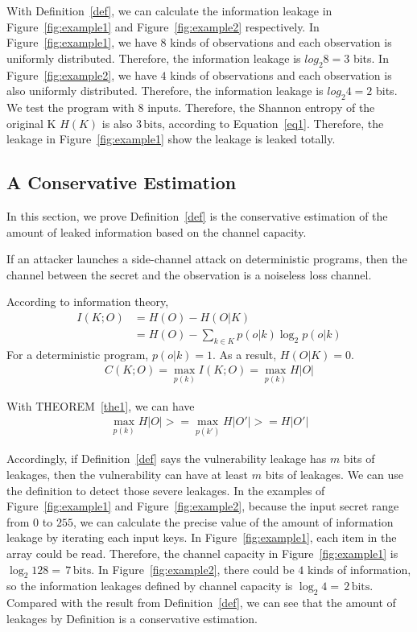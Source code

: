 With Definition~\ref{def}, we can calculate the information leakage in Figure~\ref{fig:example1} and Figure~\ref{fig:example2} respectively. In Figure~\ref{fig:example1}, we have $8$ kinds of observations and each observation is uniformly distributed. Therefore, the information leakage is $log_2{8} = 3$ bits. In Figure~\ref{fig:example2}, we have $4$ kinds of observations and each observation is also uniformly distributed. Therefore, the information leakage is $log_2{4} = 2$ bits. We test the program with $8$ inputs. Therefore, the Shannon entropy of the original K $H(K)$ is also $3\,\mathrm{bits}$, according to Equation~\ref{eq1}. Therefore, the leakage in Figure~\ref{fig:example1} show the leakage is leaked totally.

\subsection{A Conservative Estimation}
In this section, we prove Definition~\ref{def} is the conservative estimation of the amount of leaked information based on the channel capacity.

\begin{theorem}\label{the1}
  If an attacker launches a side-channel attack on  deterministic programs, then the channel between the secret and the observation is a noiseless loss channel.
\end{theorem}

\begin{myprof}
  According to information theory,
  \begin{align*}
    I(K;O) & = H(O) - H(O|K)                                \\
           & = H(O) - \sum_{k {\in} K }{p(o|k)\log_2p(o|k)}
  \end{align*}
  For a deterministic program, $p(o|k)=1$. As a result, $H(O|K) = 0$.
  \begin{align*}
    C(K;O) = \max_{p(k)} I(K;O) = \max_{p(k)} H |O|
  \end{align*}
\end{myprof}

With THEOREM~\ref{the1}, we can have
\begin{align*}
  \max_{p(k)} H |O| >= \max_{p(k')} H |O'| >= H |O'|
\end{align*}

Accordingly, if Definition~\ref{def} says the vulnerability leakage has $m$ bits of leakages, then the vulnerability can have at least $m$ bits of leakages. We can use the definition to detect those severe leakages. In the examples of Figure~\ref{fig:example1} and Figure~\ref{fig:example2}, because the input secret range from $0$ to $255$, we can calculate the precise value of the amount of information leakage by iterating each input keys. In Figure~\ref{fig:example1}, each item in the array could be read. Therefore, the channel capacity in Figure~\ref{fig:example1} is $\log_2{128} = \,7\, \mathrm{bits}$. In Figure~\ref{fig:example2}, there could be $4$ kinds of information, so the information leakages defined by channel capacity is $\log_2{4} = \,2\, \mathrm{bits}$. Compared with the result from Definition~\ref{def}, we can see that the amount of leakages by Definition is a conservative estimation.

